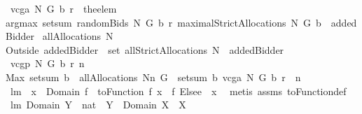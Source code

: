 \begin{isabellebody}
\isamarkupfalse%
\ {\isachardoublequoteopen}vcga\ N\ G\ b\ r\ {\isacharequal}{\isacharequal}\ {\isacharparenleft}the{\isacharunderscore}elem\isanewline
{\isacharparenleft}argmax\ {\isacharparenleft}setsum\ {\isacharparenleft}randomBids\ N\ G\ b\ r{\isacharparenright}{\isacharparenright}\ {\isacharparenleft}maximalStrictAllocations\ N\ G\ b{\isacharparenright}{\isacharparenright}{\isacharparenright}\ {\isacharminus}{\isacharminus}\ addedBidder{\isacharprime}{\isachardoublequoteclose}\isanewline
\isanewline
{}\isamarkupfalse%
\ {\isachardoublequoteopen}allAllocations\ N\ {\isasymOmega}\ {\isacharequal}{\isacharequal}\ \isanewline
{\isacharparenleft}Outside{\isacharprime}\ {\isacharbraceleft}addedBidder{\isacharprime}{\isacharbraceright}{\isacharparenright}\ {\isacharbackquote}\ set\ {\isacharparenleft}allStrictAllocations\ {\isacharparenleft}N\ {\isasymunion}\ {\isacharbraceleft}addedBidder{\isacharprime}{\isacharbraceright}{\isacharparenright}\ {\isasymOmega}{\isacharparenright}{\isachardoublequoteclose}\isanewline
{}\isamarkupfalse%
\ {\isachardoublequoteopen}vcgp\ N\ G\ b\ r\ n\ {\isacharequal}\isanewline
Max\ {\isacharparenleft}setsum\ b\ {\isacharbackquote}\ {\isacharparenleft}allAllocations\ {\isacharparenleft}N{\isacharminus}{\isacharbraceleft}n{\isacharbraceright}{\isacharparenright}\ G{\isacharparenright}{\isacharparenright}\ {\isacharminus}\ {\isacharparenleft}setsum\ b\ {\isacharparenleft}vcga\ N\ G\ b\ r\ {\isacharminus}{\isacharminus}\ n{\isacharparenright}{\isacharparenright}{\isachardoublequoteclose}\isanewline
\isanewline
{}\isamarkupfalse%
\ lm{}{}{\isacharcolon}\ \ {\isachardoublequoteopen}x\ {\isasymin}\ Domain\ f{\isachardoublequoteclose}\ \ {\isachardoublequoteopen}toFunction\ f\ x\ {\isacharequal}\ {\isacharparenleft}f\ Elsee\ {}{\isacharparenright}\ x{\isachardoublequoteclose}\ \isanewline
%
\isadelimproof
%
\endisadelimproof
%
\isatagproof
{}\isamarkupfalse%
\ {\isacharparenleft}metis\ assms\ toFunction{\isacharunderscore}def{\isacharparenright}%
\endisatagproof
{\isafoldproof}%
%
\isadelimproof
\isanewline
%
\endisadelimproof
{}\isamarkupfalse%
\ lm{}{}{\isacharcolon}\ {\isachardoublequoteopen}Domain\ {\isacharparenleft}Y\ {\isasymtimes}\ {\isacharbraceleft}{}{\isacharcolon}{\isacharcolon}nat{\isacharbraceright}{\isacharparenright}\ {\isacharequal}\ Y\ {\isacharampersand}\ Domain\ {\isacharparenleft}X\ {\isasymtimes}\ {\isacharbraceleft}{}{\isacharbraceright}{\isacharparenright}{\isacharequal}X{\isachardoublequoteclose}%

\end{isabellebody}
